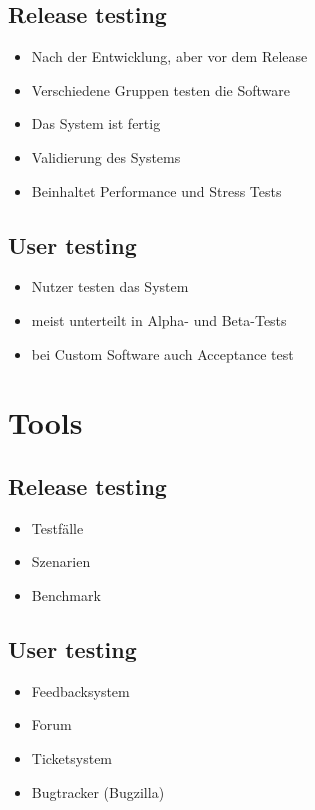 \documentclass{beamer}
\begin{document}
	\subsection{Release testing}
	\begin{frame}
		\begin{itemize}
			\item Nach der Entwicklung, aber vor dem Release
			\item Verschiedene Gruppen testen die Software
			\item Das System ist fertig
			\item Validierung des Systems
			\item Beinhaltet Performance und Stress Tests
		\end{itemize}
	\end{frame}
	\subsection{User testing}
	\begin{frame}
		\begin{itemize}
			\item Nutzer testen das System
			\item meist unterteilt in Alpha- und Beta-Tests
			\item bei Custom Software auch Acceptance test
		\end{itemize}
	\end{frame}
	\section{Tools}
	\subsection{Release testing}
	\begin{frame}
		\begin{itemize}
			\item Testfälle
			\item Szenarien
			\item Benchmark
		\end{itemize}
	\end{frame}
	\subsection{User testing}
	\begin{frame}
		\begin{itemize}
			\item Feedbacksystem
			\item Forum
			\item Ticketsystem
			\item Bugtracker (Bugzilla)
		\end{itemize}
	\end{frame}
\end{document}
